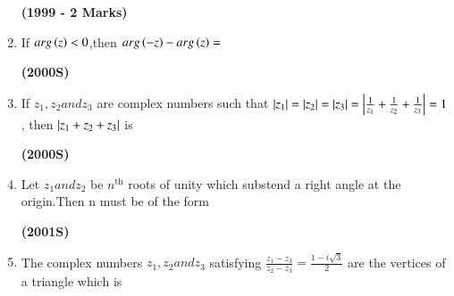 \documentclass[journal,12pt,twocolumn]{IEEEtran}
\theoremstyle{remark}
\begin{document}
\begin{enumerate}[start=6]
\hfill{\textbf{(1999 - 2 Marks)}}

\begin{enumerate}
\end{enumerate}
\item If $arg\left(z\right)<0$,then $arg\left(-z\right)-arg\left(z\right)=$

\hfill{\textbf{(2000S)}}

\begin{enumerate}
\end{enumerate}
\item If $z_1,z_2 and z_3$ are complex numbers such that $\left\vert z_1\right\vert=\left\vert z_2\right\vert=\left\vert z_3\right\vert=\left\vert\frac{1}{z_1}+\frac{1}{z_2}+\frac{1}{z_3}\right\vert=1$, then $\left\vert z_1+z_2+z_3\right\vert$ is 

\hfill{\textbf{(2000S)}}

\begin{enumerate}
\end{enumerate}
\item Let $z_1 and z_2$ be $n^{\text{th}}$ roots of unity which substend a right angle at the origin.Then n must be of the form

\hfill{\textbf{(2001S)}}

\begin{enumerate}
\end{enumerate}
\item The complex numbers $z_1,z_2 and z_3$ satisfying $\frac{z_1-z_3}{z_2-z_3}=\frac{1-i\sqrt{3}}{2}$ are the vertices of a triangle which is


\end{enumerate}
\end{document}
